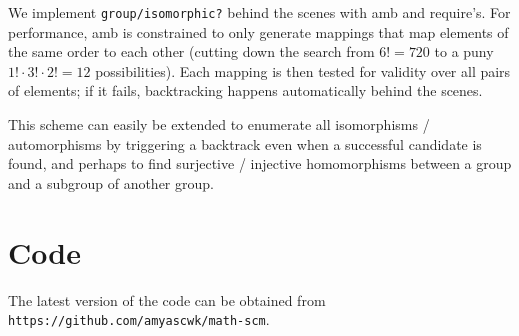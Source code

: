 \documentclass{article}
\begin{document}
		We implement \texttt{group/isomorphic?} behind the scenes with amb and require's. For performance, amb is constrained to only generate mappings that map elements of the same order to each other (cutting down the search from $6! = 720$ to a puny $1! \cdot 3! \cdot 2! = 12$ possibilities). Each mapping is then tested for validity over all pairs of elements; if it fails, backtracking happens automatically behind the scenes.
		
		This scheme can easily be extended to enumerate all isomorphisms / automorphisms by triggering a backtrack even when a successful candidate is found, and perhaps to find surjective / injective homomorphisms between a group and a subgroup of another group.    
    \section{Code}
        
        The latest version of the code can be obtained from \texttt{https://github.com/amyascwk/math-scm}.
        
    
\end{document}

